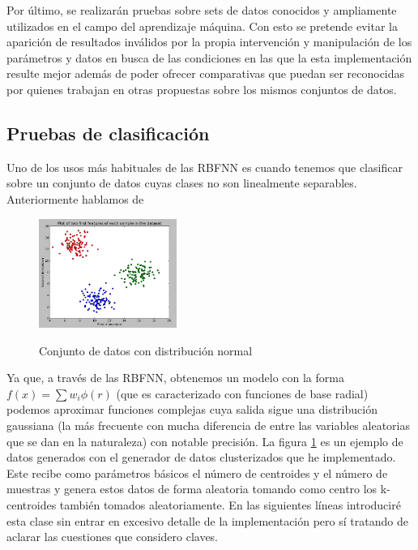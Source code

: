 \documentclass[10pt,a4paper, twocolumn]{report}
\begin{document}
Por último, se realizarán pruebas sobre sets de datos conocidos y ampliamente utilizados en el campo del aprendizaje máquina. Con esto se pretende evitar la aparición de resultados inválidos por la propia intervención y manipulación de los parámetros y datos en busca de las condiciones en las que la esta implementación resulte mejor además de poder ofrecer comparativas que puedan ser reconocidas por quienes trabajan en otras propuestas sobre los mismos conjuntos de datos.

\subsection{Pruebas de clasificación}
Uno de los usos más habituales de las RBFNN es cuando tenemos que clasificar sobre un conjunto de datos cuyas clases no son linealmente separables. Anteriormente hablamos de
\begin{figure}[!h]{}
    \centering
    \includegraphics[width=0.4\textwidth]{img/clusteredData1.png}
    \label{fig:clusteredData1}
    \caption{Conjunto de datos con distribución normal}
\end{figure}
Ya que, a través de las RBFNN, obtenemos un modelo con la forma $f(x)=\sum w_{i}\phi(r)$ (que es caracterizado con funciones de base radial) podemos aproximar funciones complejas cuya salida sigue una distribución gaussiana (la más frecuente con mucha diferencia de entre las variables aleatorias que se dan en la naturaleza) con notable precisión. 
La figura \ref{fig:clusteredData1} es un ejemplo de datos generados con el generador de datos clusterizados que he implementado. Este recibe como parámetros básicos el número de centroides y el número de muestras y genera estos datos de forma aleatoria tomando como centro los k-centroides también tomados aleatoriamente. En las siguientes líneas introduciré esta clase sin entrar en excesivo detalle de la implementación pero sí tratando de aclarar las cuestiones que considero claves.
\end{document}

